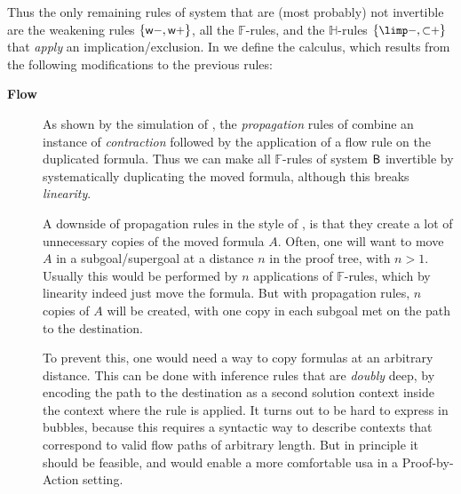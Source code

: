 Thus the only remaining rules of system  that are (most probably) not
invertible are the weakening rules $\{\text{\small$\mathsf{w{-}}$},\text{\small$\mathsf{w{+}}$}\}$, all the
$\mathbb{F}$-rules, and the $\mathbb{H}$-rules $\{\rsf{{\limp}{-}},
\rsf{{\lsub}{+}}\}$ that \emph{apply} an implication/exclusion. In  we
define the  calculus, which results from the following
modifications to the previous rules:
\begin{description}
  \item[\textbf{Flow}]
  As shown by the simulation of , the
  \emph{propagation} rules of  combine an instance of
  \emph{contraction} followed by the application of a flow rule on the
  duplicated formula. Thus we can make all $\mathbb{F}$-rules of system $\sysB$
  invertible by systematically duplicating the moved formula, although this
  breaks \emph{linearity}.

  A downside of propagation rules in the style of , is that they
  create a lot of unnecessary copies of the moved formula $A$. Often, one will
  want to move $A$ in a subgoal/supergoal at a distance $n$ in the proof tree,
  with $n > 1$. Usually this would be performed by $n$ applications of
  $\mathbb{F}$-rules, which by linearity indeed just move the formula. But with
  propagation rules, $n$ copies of $A$ will be created, with one copy in each
  subgoal met on the path to the destination.

  To prevent this, one would need a way to copy formulas at an arbitrary
  distance. This can be done with inference rules that are \emph{doubly} deep,
  by encoding the path to the destination as a second solution context inside
  the context where the rule is applied. It turns out to be hard
  to express in bubbles, because this requires a syntactic way to describe
  contexts that correspond to valid flow paths of arbitrary length. But in principle it should be feasible,
  and would enable a more comfortable usa in a Proof-by-Action setting.


\end{description}
